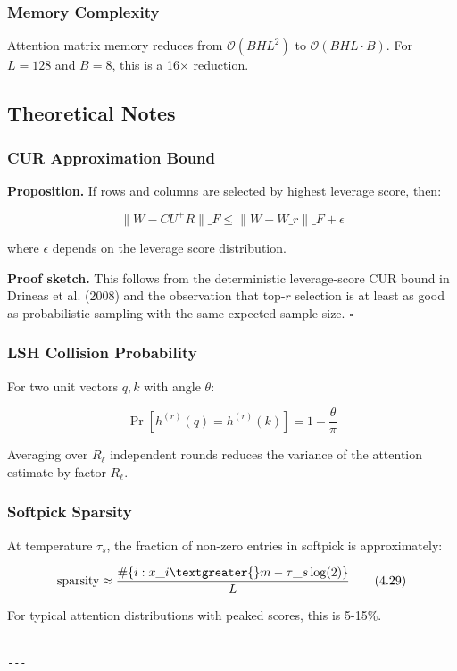 \subsubsection{Memory Complexity}

Attention matrix memory reduces from $\mathcal{O}(B H L^2)$ to 
$\mathcal{O}(B H L \cdot B)$. For $L = 128$ and $B = 8$, this is a 16$\times$ reduction.

\subsection{Theoretical Notes}

\subsubsection{CUR Approximation Bound}

\textbf{Proposition.} If rows and columns are selected by highest leverage score, then:

\[
\|W - C U^+ R\|\_F \leq \|W - W\_r\|\_F + \epsilon
\tag{4.27}
\]

where $\epsilon$ depends on the leverage score distribution.

\textbf{Proof sketch.} This follows from the deterministic leverage-score CUR bound 
in Drineas et al. (2008) and the observation that top-$r$ selection is at least 
as good as probabilistic sampling with the same expected sample size. $\square$

\subsubsection{LSH Collision Probability}

For two unit vectors $q, k$ with angle $\theta$:

\[
\Pr[h^{(r)}(q) = h^{(r)}(k)] = 1 - \frac{\theta}{\pi}
\tag{4.28}
\]

Averaging over $R_\ell$ independent rounds reduces the variance of the 
attention estimate by factor $R_\ell$.

\subsubsection{Softpick Sparsity}

At temperature $\tau_s$, the fraction of non-zero entries in softpick is 
approximately:

\[
\text{sparsity} \approx \frac{\#\{i : x\_i \textgreater{} m - \tau\_s \log(2)\}}{L}
\tag{4.29}
\]

For typical attention distributions with peaked scores, this is 5-15\%.
\begin{lstlisting}

---
\end{lstlisting}